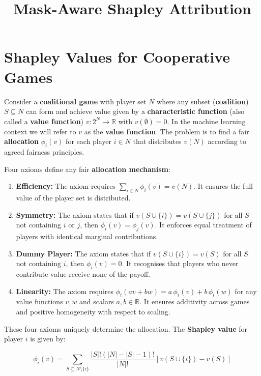 \documentclass{article}
\title{Mask-Aware Shapley Attribution}
\author{}
\date{}
\begin{document}
\maketitle

\section{Shapley Values for Cooperative Games}

Consider a \textbf{coalitional game} with player set $N$ where any subset (\textbf{coalition}) $S \subseteq N$ can form and achieve value given by a \textbf{characteristic function} (also called a \textbf{value function}) $v: 2^N \to \mathbb{R}$ with $v(\emptyset) = 0$.
In the machine learning context we will refer to $v$ as the \textbf{value function}.
The problem is to find a fair \textbf{allocation} $\phi_i(v)$ for each player $i \in N$ that distributes $v(N)$ according to agreed fairness principles.

Four axioms define any fair \textbf{allocation mechanism}:

\begin{enumerate}
    \item \textbf{Efficiency:} The axiom requires $\sum_{i \in N} \phi_i(v) = v(N)$.
    It ensures the full value of the player set is distributed.

    \item \textbf{Symmetry:} The axiom states that if $v(S \cup \{i\}) = v(S \cup \{j\})$ for all $S$ not containing $i$ or $j$, then $\phi_i(v) = \phi_j(v)$.
    It enforces equal treatment of players with identical marginal contributions.

    \item \textbf{Dummy Player:} The axiom states that if $v(S \cup \{i\}) = v(S)$ for all $S$ not containing $i$, then $\phi_i(v) = 0$.
    It recognises that players who never contribute value receive none of the payoff.

    \item \textbf{Linearity:} The axiom requires $\phi_i(av + bw) = a\,\phi_i(v) + b\,\phi_i(w)$ for any value functions $v, w$ and scalars $a, b \in \mathbb{R}$.
    It ensures additivity across games and positive homogeneity with respect to scaling.
\end{enumerate}

These four axioms uniquely determine the allocation.
The \textbf{Shapley value} for player $i$ is given by:

\begin{equation}
\phi_i(v) = \sum_{S \subseteq N \setminus \{i\}} \frac{|S|! (|N| - |S| - 1)!}{|N|!} \left[ v(S \cup \{i\}) - v(S) \right]
\end{equation}
\end{document}
